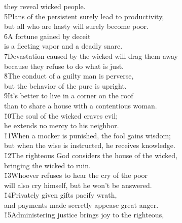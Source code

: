 \begin{poetry}
\poemll    they reveal wicked people. \\
\poeml \v{5}Plans of the persistent surely lead to productivity, \\
\poemll    but all who are hasty will surely become poor. \\
\poeml \v{6}A fortune gained by deceit \\
\poemll    is a fleeting vapor and a deadly snare. \\
\poeml \v{7}Devastation caused by the wicked will drag them away \\
\poemll    because they refuse to do what is just. \\
\poeml \v{8}The conduct of a guilty man is perverse, \\
\poemll    but the behavior of the pure is upright. \\
\poeml \v{9}It's better to live in a corner on the roof \\
\poemll    than to share a house with a contentious woman. \\
\poeml \v{10}The soul of the wicked craves evil; \\
\poemll    he extends no mercy to his neighbor. \\
\poeml \v{11}When a mocker is punished, the fool gains wisdom; \\
\poemll    but when the wise is instructed, he receives knowledge. \\
\poeml \v{12}The righteous God considers the house of the wicked, \\
\poemll    bringing the wicked to ruin. \\
\poeml \v{13}Whoever refuses to hear the cry of the poor \\
\poemll    will also cry himself, but he won't be answered. \\
\poeml \v{14}Privately given gifts pacify wrath, \\
\poemll    and payments made secretly appease great anger. \\
\poeml \v{15}Administering justice brings joy to the righteous, \\

\end{poetry}
